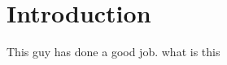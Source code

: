 \section{Introduction}\label{sec:introduction}

This guy \cite{brekke21} has done a good job.
what is this




